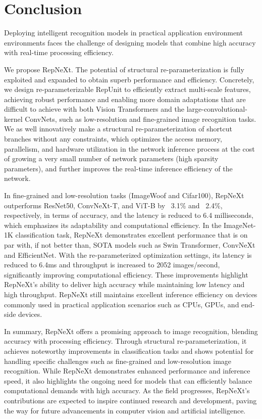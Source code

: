 \documentclass[preprint,12pt]{elsarticle}
\begin{document}
\section{Conclusion}
\label{sec:conclusion}

Deploying intelligent recognition models in practical application environment environments faces the challenge of designing models that combine high accuracy with real-time processing efficiency.

We propose RepNeXt. The potential of structural re-parameterization is fully exploited and expanded to obtain superb performance and efficiency. Concretely, we design re-parameterizable RepUnit to efficiently extract multi-scale features, achieving robust performance and enabling more domain adaptations that are difficult to achieve with both Vision Transformers and the large-convolutional-kernel ConvNets, such as low-resolution and fine-grained image recognition tasks. We as well innovatively make a structural re-parameterization of shortcut branches without any constraints, which optimizes the access memory, parallelism, and hardware utilization in the network inference process at the cost of growing a very small number of network parameters (high sparsity parameters), and further improves the real-time inference efficiency of the network.

In fine-grained and low-resolution tasks (ImageWoof and Cifar100), RepNeXt outperforms ResNet50, ConvNeXt-T, and ViT-B by ~3.1\% and ~2.4\%, respectively, in terms of accuracy, and the latency is reduced to 6.4 milliseconds, which emphasizes its adaptability and computational efficiency. In the ImageNet-1K classification task, RepNeXt demonstrates excellent performance that is on par with, if not better than, SOTA models such as Swin Transformer, ConvNeXt and EfficientNet. With the re-parameterized optimization settings, its latency is reduced to 6.4ms and throughput is increased to 2052 images/second, significantly improving computational efficiency. These improvements highlight RepNeXt's ability to deliver high accuracy while maintaining low latency and high throughput. RepNeXt still maintains excellent inference efficiency on devices commonly used in practical application scenarios such as CPUs, GPUs, and end-side devices.

In summary, RepNeXt offers a promising approach to image recognition, blending accuracy with processing efficiency. Through structural re-parameterization, it achieves noteworthy improvements in classification tasks and shows potential for handling specific challenges such as fine-grained and low-resolution image recognition. While RepNeXt demonstrates enhanced performance and inference speed, it also highlights the ongoing need for models that can efficiently balance computational demands with high accuracy. As the field progresses, RepNeXt's contributions are expected to inspire continued research and development, paving the way for future advancements in computer vision and artificial intelligence.
\end{document}
